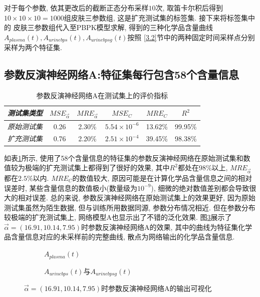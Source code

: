 \documentclass[a4paper,punct=banjiao,twoside]{ctexrep}
\theoremstyle{plain}
\theoremstyle{definition}
\theoremstyle{remark}
\begin{document}
\noindent 对于每个参数, 依其更改后的截断正态分布采样$10$次, 取笛卡尔积后得到$10\times10\times10 = 1000$组皮肤三参数组, 这是扩充测试集的标签集. 接下来将标签集中的
皮肤三参数组代入至PBPK模型求解, 得到的三种化学品含量曲线$A_{plasma}(t), A_{urinebps}(t), A_{urinebpsg}(t)$按照
\ref{3.2}节中的两种固定时间采样点分别采样为两个特征集.

\subsection*{参数反演神经网络A:特征集每行包含58个含量信息}
\begin{table}[htbp]
  \centering
  \begin{tabular}[t]{l*{5}{c}}
    \hline
    \textit{测试集类型} &$MSE_{\vec{\alpha}}$&$MRE_{\vec{\alpha}}$ & $MSE_{C}$& $MRE_{C}$& $R^2$\\
    \hline
    \textit{原始测试集} &  0.26   &   2.30\%     &   $5.54\times 10^{-6}$     &  13.62\%     &  99.95\%  \\ 
    \textit{扩充测试集} &  0.76   &   2.20\%     &   $2.51\times 10^{-4}$     &  39.45\%     &  98.38\%  \\ 
    \hline
  \end{tabular}
  \caption{\label{tab4.1}参数反演神经网络A在测试集上的评价指标} 
\end{table}  
如表\ref{tab4.1}所示, 使用了58个含量信息的特征集的参数反演神经网络在原始测试集和数值较为极端的扩充测试集上都得到了很好的效果, 其中$R^2$都处在$98\%$以上, $MRE_{\vec{\alpha}}$都在$2.5\%$以内.
$MRE_{C}$的数值较大, 原因可能是在计算化学品含量信息之间的相对误差时, 某些含量信息的数值极小(数量级为$10^{-9}$), 细微的绝对数值差别都会导致很大的相对误差. 
总的来说, 参数反演神经网络在原始测试集上的效果更好, 因为原始测试集虽然为陌生数据, 但与训练所用数据同源, 参数分布情况相近. 但在参数分布较极端的扩充测试集上, 网络模型A也显示出了不错的泛化效果.
图\ref{反演A}展示了$\vec{\alpha}=(16.91,10.14,7.95)$时参数反演神经网络A的效果, 其中的曲线为特征集化学品含量信息对应的未采样前的完整曲线, 散点为网络输出的化学品含量信息.
\begin{figure}[H]
  \centering
  \begin{subfigure}{0.45\textwidth}
    \centering
    \resizebox{1\textwidth}{!}{}
    \label{反演A1}
    \caption{$A_{plasma}(t)$}
  \end{subfigure}
  \begin{subfigure}{0.45\textwidth}
    \centering
    \resizebox{1\textwidth}{!}{}
    \label{反演A2}
    \caption{$A_{urinebps}(t)$与$A_{urinebpsg}(t)$}
  \end{subfigure}
  \caption{$\vec{\alpha}=(16.91,10.14,7.95)$时参数反演神经网络A的输出可视化}
  \label{反演A}
\end{figure}
\end{document}
